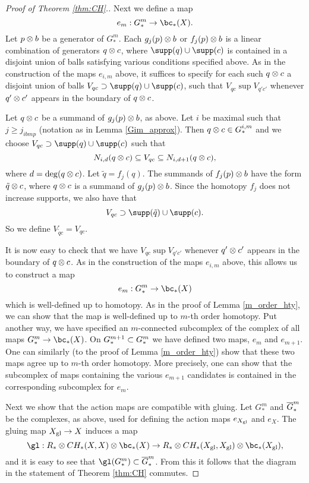 {\begin{proof}[Proof of Theorem \ref{thm:CH}.]
Next we define a map
\[
	e_m : G^m_* \to \bc_*(X) .
\]
Let $p\otimes b$ be a generator of $G^m_*$.
Each $g_j(p)\otimes b$ or $f_j(p)\otimes b$ is a linear combination of generators $q\otimes c$,
where $\supp(q)\cup\supp(c)$ is contained in a disjoint union of balls satisfying 
various conditions specified above.
As in the construction of the maps $e_{i,m}$ above,
it suffices to specify for each such $q\otimes c$ a disjoint union of balls
$V_{qc} \sup \supp(q)\cup\supp(c)$, such that $V_{qc} \sup V_{q'c'}$
whenever $q'\otimes c'$ appears in the boundary of $q\otimes c$.

Let $q\otimes c$ be a summand of $g_j(p)\otimes b$, as above.
Let $i$ be maximal such that $j\ge j_{ibmp}$
(notation as in Lemma \ref{Gim_approx}).
Then $q\otimes c \in G^{i,m}_*$ and we choose $V_{qc} \sup \supp(q)\cup\supp(c)$
such that 
\[
	N_{i,d}(q\otimes c) \subseteq V_{qc} \subseteq N_{i,d+1}(q\otimes c) ,
\]
where $d = \deg(q\otimes c)$.
Let $\tilde q = f_j(q)$.
The summands of $f_j(p)\otimes b$ have the form $\tilde q \otimes c$, 
where $q\otimes c$ is a summand of $g_j(p)\otimes b$.
Since the homotopy $f_j$ does not increase supports, we also have that
\[
	V_{qc} \sup \supp(\tilde q) \cup \supp(c) .
\]
So we define $V_{\tilde qc} = V_{qc}$.

It is now easy to check that we have $V_{qc} \sup V_{q'c'}$
whenever $q'\otimes c'$ appears in the boundary of $q\otimes c$.
As in the construction of the maps $e_{i,m}$ above,
this allows us to construct a map
\[
	e_m : G^m_* \to \bc_*(X) 
\]
which is well-defined up to homotopy.
As in the proof of Lemma \ref{m_order_hty}, we can show that the map is well-defined up
to $m$-th order homotopy.
Put another way, we have specified an $m$-connected subcomplex of the complex of
all maps $G^m_* \to \bc_*(X)$.
On $G^{m+1}_* \subset G^m_*$ we have defined two maps, $e_m$ and $e_{m+1}$.
One can similarly (to the proof of Lemma \ref{m_order_hty}) show that 
these two maps agree up to $m$-th order homotopy.
More precisely, one can show that the subcomplex of maps containing the various
$e_{m+1}$ candidates is contained in the corresponding subcomplex for $e_m$.

\medskip

Next we show that the action maps are compatible with gluing.
Let $G^m_*$ and $\overline{G}^m_*$ be the complexes, as above, used for defining
the action maps $e_{X_\mathrm{gl}}$ and $e_X$.
The gluing map $X_\mathrm{gl}\to X$ induces a map
\[
	\gl:  R_*\ot CH_*(X, X) \otimes \bc_*(X)  \to R_*\ot CH_*(X\sgl, X \sgl) \otimes \bc_*(X \sgl) ,
\]
and it is easy to see that $\gl(G^m_*)\sub \ol{G}^m_*$.
From this it follows that the diagram in the statement of Theorem \ref{thm:CH} commutes.


\end{proof}}
